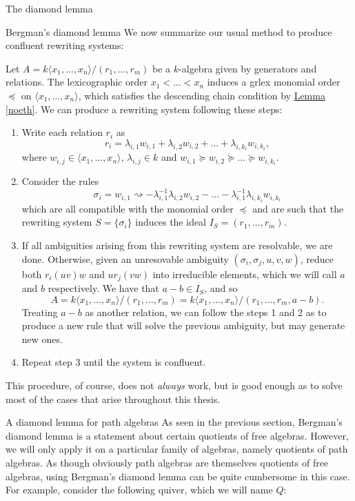 \begin{chapter}{The diamond lemma}
\begin{section}{Bergman's diamond lemma}
We now summarize our usual method to produce confluent rewriting systems:

\begin{heur}\label{heuristic} Let $A=k\langle x_1,\dots,x_n\rangle/(r_1,\dots,r_m)$ be a $k$-algebra given by generators and relations. The lexicographic order $x_1<\dots<x_n$ induces a grlex monomial order $\preceq$ on $\langle x_1,\dots,x_n\rangle$, which satisfies the descending chain condition by \hyperref[noeth]{Lemma \ref*{noeth}}. We can produce a rewriting system following these steps:
\begin{enumerate}
\item Write each relation $r_i$ as
\[r_i = \lambda_{i,1}w_{i,1} + \lambda_{i,2} w_{i,2} + \dots + \lambda_{i,k_i} w_{i, k_i},\]
where $w_{i,j}\in \langle x_1,\dots,x_n\rangle$, $\lambda_{i,j}\in k$ and $w_{i,1}\succeq w_{i,2}\succeq\dots\succeq w_{i,k_i}$.
\item Consider the rules
\[\sigma_i = w_{i,1} \rightsquigarrow -\lambda_{i,1}^{-1}\lambda_{i,2}w_{i,2}-\dots-\lambda_{i,1}^{-1}\lambda_{i,k_i}w_{i,k_i}\]
which are all compatible with the monomial order $\preceq$ and are such that the rewriting system $S=\{\sigma_i\}$ induces the ideal $I_S=(r_1,\dots,r_m)$.
\item If all ambiguities arising from this rewriting system are resolvable, we are done. Otherwise, given an unresovable ambiguity $(\sigma_i, \sigma_j, u,v,w)$, reduce both $r_i(uv)w$ and $ur_j(vw)$ into irreducible elements, which we will call $a$ and $b$ respectively. We have that $a-b\in I_S$, and so \[A=k\langle x_1,\dots,x_n\rangle/(r_1,\dots,r_m)=k\langle x_1,\dots,x_n\rangle/(r_1,\dots,r_m, a-b).\]
Treating $a-b$ as another relation, we can follow the steps 1 and 2 as to produce a new rule that will solve the previous ambiguity, but may generate new ones.
\item Repeat step 3 until the system is confluent.
\end{enumerate}
This procedure, of course, does not \emph{always} work, but is good enough as to solve most of the cases that arise throughout this thesis.
\end{heur}
\end{section}
\begin{section}{A diamond lemma for path algebras}
\label{path-diamond}
As seen in the previous section, Bergman's diamond lemma is a statement about certain quotients of free algebras. However, we will only apply it on a particular family of algebras, namely quotients of path algebras. As though obviously path algebras are themselves quotients of free algebras, using Bergman's diamond lemma can be quite cumbersome in this case. For example, consider the following quiver, which we will name $Q$:

\end{section}
\end{chapter}
